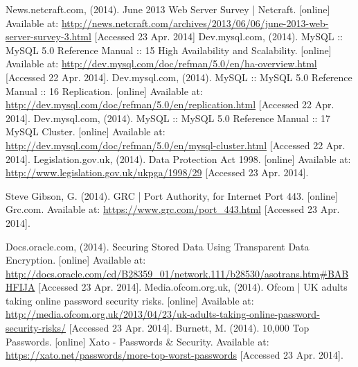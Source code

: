 \documentclass[11pt]{article}
\begin{document}
\begin{thebibliography}{40}
\begin{singlespace}
News.netcraft.com, (2014). June 2013 Web Server Survey | Netcraft. [online] Available at: \url{http://news.netcraft.com/archives/2013/06/06/june-2013-web-server-survey-3.html} [Accessed 23 Apr. 2014]
Dev.mysql.com, (2014). MySQL :: MySQL 5.0 Reference Manual :: 15 High Availability and Scalability. [online] Available at: \url{http://dev.mysql.com/doc/refman/5.0/en/ha-overview.html} [Accessed 22 Apr. 2014].
Dev.mysql.com, (2014). MySQL :: MySQL 5.0 Reference Manual :: 16 Replication. [online] Available at: \url{http://dev.mysql.com/doc/refman/5.0/en/replication.html} [Accessed 22 Apr. 2014].
Dev.mysql.com, (2014). MySQL :: MySQL 5.0 Reference Manual :: 17 MySQL Cluster. [online] Available at: \url{http://dev.mysql.com/doc/refman/5.0/en/mysql-cluster.html} [Accessed 22 Apr. 2014].
Legislation.gov.uk, (2014). Data Protection Act 1998. [online] Available at: \url{http://www.legislation.gov.uk/ukpga/1998/29} [Accessed 23 Apr. 2014].

Steve Gibson, G. (2014). GRC | Port Authority, for Internet Port 443. [online] Grc.com. Available at: \url{https://www.grc.com/port_443.html} [Accessed 23 Apr. 2014].

Docs.oracle.com, (2014). Securing Stored Data Using Transparent Data Encryption. [online] Available at: \url{http://docs.oracle.com/cd/B28359_01/network.111/b28530/asotrans.htm#BABHFIJA} [Accessed 23 Apr. 2014].
Media.ofcom.org.uk, (2014). Ofcom | UK adults taking online password security risks. [online] Available at: \url{http://media.ofcom.org.uk/2013/04/23/uk-adults-taking-online-password-security-risks/} [Accessed 23 Apr. 2014].
Burnett, M. (2014). 10,000 Top Passwords. [online] Xato - Passwords \& Security. Available at: \url{https://xato.net/passwords/more-top-worst-passwords} [Accessed 23 Apr. 2014].


\end{singlespace}
\end{thebibliography}
\end{document}
